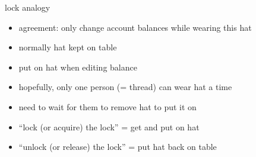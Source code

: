 \begin{frame}{lock analogy}
    \begin{itemize}
    \item agreement: only change account balances while wearing this hat
    \item normally hat kept on table
    \item put on hat when editing balance
    \vspace{.5cm}
    \item hopefully, only one person (= thread) can wear hat a time
    \item need to wait for them to remove hat to put it on
        \vspace{.5cm}
    \item<2-> ``lock (or acquire) the lock'' = get and put on hat
    \item<2-> ``unlock (or release) the lock'' = put hat back on table
    \end{itemize}
\end{frame}

